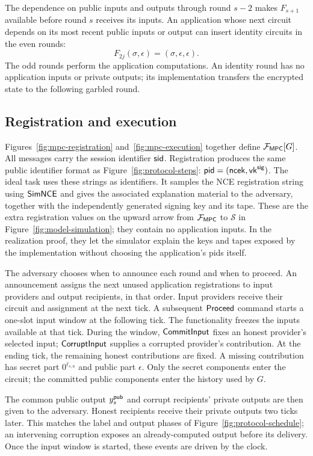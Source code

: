 The dependence on public inputs and outputs through round $s-2$ makes
$F_{s+1}$ available before round $s$ receives its inputs.  An application
whose next circuit depends on its most recent public inputs or output
can insert identity circuits in the even rounds:
\[
  F_{2j}(\sigma,\epsilon)=(\sigma,\epsilon,\epsilon).
\]
The odd rounds perform the application computations.  An identity round
has no application inputs or private outputs; its implementation transfers
the encrypted state to the following garbled round.

\subsection{Registration and execution}
\label{sec:mpc-execution}

Figures~\ref{fig:mpc-registration} and~\ref{fig:mpc-execution} together
define $\mathcal F_{\mathsf{MPC}}[G]$.  All messages carry the session identifier $\mathsf{sid}$.
Registration produces the same public identifier format as
Figure~\ref{fig:protocol-steps}: $\mathsf{pid}=(\mathsf{ncek},\mathsf{vk}^{\mathsf{sig}})$.
The ideal task uses these strings as identifiers.  It samples the NCE
registration string using $\mathsf{SimNCE}$ and gives the associated explanation
material to the adversary, together with the independently generated
signing key and its tape.  These are the extra registration values on
the upward arrow from $\mathcal F_{\mathsf{MPC}}$ to $\mathcal S$ in
Figure~\ref{fig:model-simulation}; they contain no application inputs.
In the realization proof, they let the simulator explain the keys and
tapes exposed by the implementation without choosing the application's
pids itself.

The adversary chooses when to announce each round and when to proceed.
An announcement assigns the next unused application registrations to
input providers and output recipients, in that order.  Input providers
receive their circuit and assignment at the next tick.  A subsequent
$\mathsf{Proceed}$ command starts a one-slot input window at the following tick.
The functionality freezes the inputs available at that tick.  During
the window, $\mathsf{CommitInput}$ fixes an honest provider's selected input;
$\mathsf{CorruptInput}$ supplies a corrupted provider's contribution.  At the
ending tick, the remaining honest contributions are fixed.  A missing
contribution has secret part $0^{\ell_{s,a}}$ and public part $\epsilon$.
Only the secret components enter the circuit; the committed public
components enter the history used by $G$.

The common public output $y^{\mathsf{pub}}_s$ and corrupt recipients' private
outputs are then given to the adversary.  Honest recipients receive their
private outputs two ticks later.  This matches the label and output phases of
Figure~\ref{fig:protocol-schedule}; an intervening corruption exposes an
already-computed output before its delivery.  Once the input window is
started, these events are driven by the clock.

